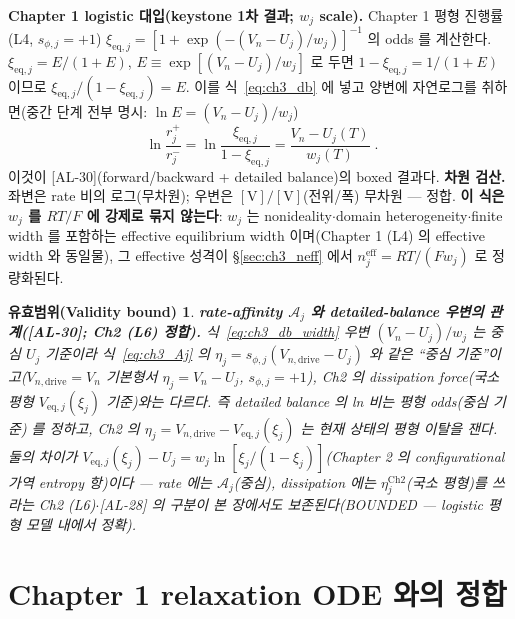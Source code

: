 \documentclass[11pt,a4paper]{article}
\newtheorem*{boundbox}{유효범위(Validity bound)}
\newcommand{\eff}{\mathrm{eff}}
\newcommand{\eq}{\mathrm{eq}}
\newcommand{\drive}{\mathrm{drive}}
\newcommand{\AL}[1]{\textsf{[AL-#1]}}
\begin{document}
\textbf{Chapter 1 logistic 대입(keystone 1차 결과; $w_j$ scale).} Chapter 1 평형 진행률
(L4, $s_{\phi,j}=+1$) $\xi_{\eq,j}=[1+\exp(-(V_n-U_j)/w_j)]^{-1}$ 의 odds 를 계산한다. $\xi_{\eq,j}=E/(1+E)$,
$E\equiv\exp[(V_n-U_j)/w_j]$ 로 두면 $1-\xi_{\eq,j}=1/(1+E)$ 이므로 $\xi_{\eq,j}/(1-\xi_{\eq,j})=E$. 이를
식~\eqref{eq:ch3_db} 에 넣고 양변에 자연로그를 취하면(중간 단계 전부 명시: $\ln E=(V_n-U_j)/w_j$)
\begin{equation}
\boxed{\;\ln\frac{r_j^+}{r_j^-}=\ln\frac{\xi_{\eq,j}}{1-\xi_{\eq,j}}=\frac{V_n-U_j(T)}{w_j(T)}\;.}
\label{eq:ch3_db_width}
\end{equation}
이것이 \AL{30}(forward/backward + detailed balance)의 boxed 결과다. \textbf{차원 검산.} 좌변은 rate 비의
로그(무차원); 우변은 $[\mathrm V]/[\mathrm V]$(전위/폭) 무차원 — 정합. \textbf{이 식은 $w_j$ 를 $RT/F$ 에 강제로
묶지 않는다}: $w_j$ 는 nonideality$\cdot$domain heterogeneity$\cdot$finite width 를 포함하는 effective
equilibrium width 이며(Chapter 1 (L4) 의 effective width 와 동일물), 그 effective 성격이 \S\ref{sec:ch3_neff}
에서 $n_j^{\eff}=RT/(Fw_j)$ 로 정량화된다.
\begin{boundbox}
\textbf{rate-affinity $\mathcal A_j$ 와 detailed-balance 우변의 관계(\AL{30}; Ch2 (L6) 정합).} 식~\eqref{eq:ch3_db_width}
우변 $(V_n-U_j)/w_j$ 는 \emph{중심} $U_j$ 기준이라 식~\eqref{eq:ch3_Aj} 의 $\eta_j=s_{\phi,j}(V_{n,\drive}-U_j)$
와 같은 ``중심 기준''이고($V_{n,\drive}=V_n$ 기본형서 $\eta_j=V_n-U_j$, $s_{\phi,j}=+1$), Ch2 의 dissipation
force(국소 평형 $V_{\eq,j}(\xi_j)$ 기준)와는 다르다. 즉 detailed balance 의 ln 비는 \emph{평형 odds}(중심 기준)
를 정하고, Ch2 의 $\eta_j=V_{n,\drive}-V_{\eq,j}(\xi_j)$ 는 \emph{현재 상태의} 평형 이탈을 잰다. 둘의 차이가
$V_{\eq,j}(\xi_j)-U_j=w_j\ln[\xi_j/(1-\xi_j)]$(Chapter 2 의 configurational 가역 entropy 항)이다 — rate 에는
$\mathcal A_j$(중심), dissipation 에는 $\eta_j^{\mathrm{Ch2}}$(국소 평형)를 쓰라는 Ch2 (L6)$\cdot$\AL{28} 의
구분이 본 장에서도 보존된다(BOUNDED — logistic 평형 모델 내에서 정확).
\end{boundbox}

\section{Chapter 1 relaxation ODE 와의 정합}\label{sec:ch3_consistency}
\end{document}
